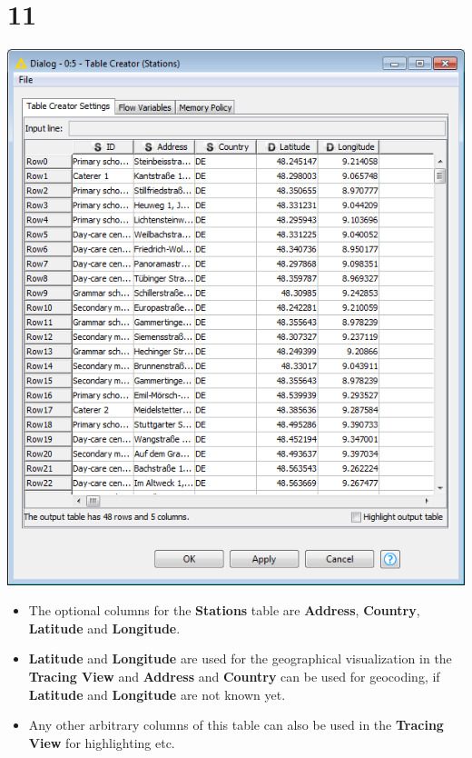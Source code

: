 \documentclass{beamer}
\begin{document}
\section{11}
\begin{frame}
	\begin{center}
  		\includegraphics[height=0.5\textheight]{11.png}
	\end{center}
	\begin{itemize}
		\item The optional columns for the \textbf{Stations} table are \textbf{Address}, \textbf{Country}, \textbf{Latitude} and \textbf{Longitude}.
		\item \textbf{Latitude} and \textbf{Longitude} are used for the geographical visualization in the \textbf{Tracing View} and \textbf{Address} and \textbf{Country} can be used for geocoding, if \textbf{Latitude} and \textbf{Longitude} are not known yet.
		\item Any other arbitrary columns of this table can also be used in the \textbf{Tracing View} for highlighting etc.
	\end{itemize}
\end{frame}
\end{document}
